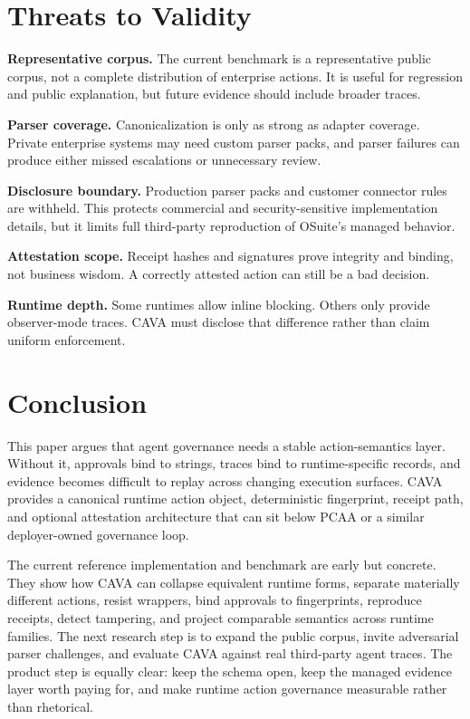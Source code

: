 \documentclass[11pt]{article}
\begin{document}
\section{Threats to Validity}

\textbf{Representative corpus.} The current benchmark is a representative public corpus, not a complete distribution of enterprise actions. It is useful for regression and public explanation, but future evidence should include broader traces.

\textbf{Parser coverage.} Canonicalization is only as strong as adapter coverage. Private enterprise systems may need custom parser packs, and parser failures can produce either missed escalations or unnecessary review.

\textbf{Disclosure boundary.} Production parser packs and customer connector rules are withheld. This protects commercial and security-sensitive implementation details, but it limits full third-party reproduction of OSuite's managed behavior.

\textbf{Attestation scope.} Receipt hashes and signatures prove integrity and binding, not business wisdom. A correctly attested action can still be a bad decision.

\textbf{Runtime depth.} Some runtimes allow inline blocking. Others only provide observer-mode traces. CAVA must disclose that difference rather than claim uniform enforcement.

\section{Conclusion}

This paper argues that agent governance needs a stable action-semantics layer. Without it, approvals bind to strings, traces bind to runtime-specific records, and evidence becomes difficult to replay across changing execution surfaces. CAVA provides a canonical runtime action object, deterministic fingerprint, receipt path, and optional attestation architecture that can sit below PCAA or a similar deployer-owned governance loop.

The current reference implementation and benchmark are early but concrete. They show how CAVA can collapse equivalent runtime forms, separate materially different actions, resist wrappers, bind approvals to fingerprints, reproduce receipts, detect tampering, and project comparable semantics across runtime families. The next research step is to expand the public corpus, invite adversarial parser challenges, and evaluate CAVA against real third-party agent traces. The product step is equally clear: keep the schema open, keep the managed evidence layer worth paying for, and make runtime action governance measurable rather than rhetorical.
\end{document}
